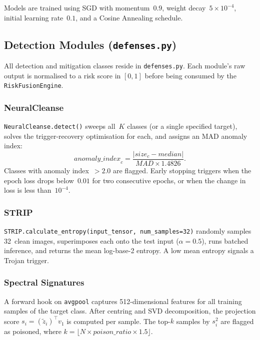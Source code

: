 \documentclass[12pt, letterpaper]{article}
\begin{document}
Models are trained using SGD with momentum~$0.9$, weight decay~$5\times10^{-4}$,
initial learning rate~$0.1$, and a Cosine Annealing schedule.

\subsection{Detection Modules (\texttt{defenses.py})}
\label{subsec:detection}

All detection and mitigation classes reside in \texttt{defenses.py}.
Each module's raw output is normalised to a risk score in $[0,1]$ before
being consumed by the \texttt{RiskFusionEngine}.

\subsubsection*{NeuralCleanse}

\texttt{NeuralCleanse.detect()} sweeps all~$K$ classes (or a single specified
target), solves the trigger-recovery optimisation for each, and assigns an MAD
anomaly index:
\begin{equation}
  \mathit{anomaly\_index}_c
    = \frac{|\mathit{size}_c - \mathit{median}|}{\mathit{MAD}\times 1.4826}.
\end{equation}
Classes with anomaly index~$>2.0$ are flagged.  Early stopping triggers when
the epoch loss drops below~$0.01$ for two consecutive epochs, or when
the change in loss is less than~$10^{-4}$.

\subsubsection*{STRIP}

\texttt{STRIP.calculate\_entropy(input\_tensor, num\_samples=32)}
randomly samples 32~clean images, superimposes each onto the test input
($\alpha=0.5$), runs batched inference, and returns the mean log-base-2
entropy.  A low mean entropy signals a Trojan trigger.

\subsubsection*{Spectral Signatures}

A forward hook on \texttt{avgpool} captures 512-dimensional features for all
training samples of the target class.  After centring and SVD decomposition,
the projection score $s_i = (\tilde{z}_i)^\top v_1$ is computed per sample.
The top-$k$ samples by $s_i^2$ are flagged as poisoned, where
$k = \lfloor N \times \mathit{poison\_ratio} \times 1.5 \rfloor$.
\end{document}
